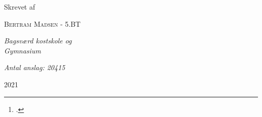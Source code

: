 \documentclass[a4paper, 8pt, oneside]{article} %
\newcommand{\plogo}{\fbox{$\mathcal{BM}$}}
\begin{document}
\begin{titlepage}
	
	Skrevet af
	
	\vspace{0.5\baselineskip} %
	
	{\scshape\Large Bertram Madsen - 5.BT} %
	
	\vspace{0.5\baselineskip} %
	
	\textit{Bagsværd kostskole og\\ Gymnasium} %

	\vspace{0.3\baselineskip} %

	\textit{Antal anslag: 20415} %
	
	\vfill %
	
	
	\plogo %
	
	\vspace{0.3\baselineskip} %
	
	2021 %
	
\end{titlepage}

\newpage
\tableofcontents
\newpage

\newpage
\begin{abstract}
	En demokratisk samfundstruktur er noget vi ser spille absolut central rolle i langt de fleste vestlige samfund, og noget som - til en vis grad - lægger til grund for næsten alle beslutninger og ændringer der idag bliver fortaget på landsplan i langt de fleste lande i hele verden.\footcite{desilver_despite_nodate}. På trods af dette er demokratiske proccessor - som bl.a. eksemplificeret ved det danske folktingsvalg - ikke nogle processor som får særligt meget opmærksomhed, og har derfor i stor grad ikke fulgt med den teknologiske udvikling som ellers har præget resten af de vestlige samfund.\\
    
	Dette projekt arbejder med at forsøge at belyse udfordringerne ved traditionelle valg, både i form af dem vi ser udelukkende ved brug af klassiske metoder som i Danmark, samt delvist digitaliserede valg som vi ser dem f.eks. i USA. I forbindelse med dette opstilles der et potentielt løsningsforslag ved brug af moderne blockchain teknologier, der redegøres for matematiken bag som gør det muligt og der diskuteres potentielle udfordringer ved denne type løsning og hvordan disse muligvis kan imødekommes.
\end{abstract}
\end{document}
